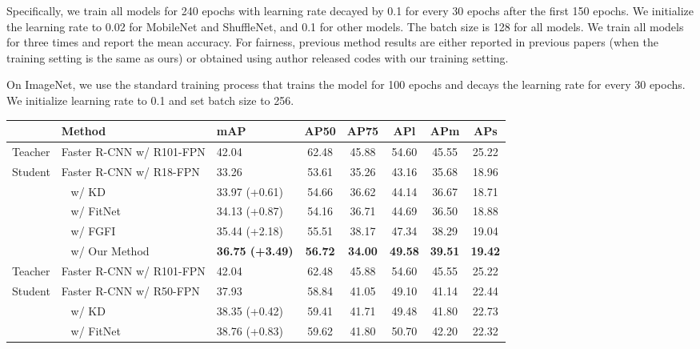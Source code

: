 \documentclass[final]{cvpr}
\begin{document}
Specifically, we train all models for 240 epochs with learning rate decayed by 0.1 for every 30 epochs after the first 150 epochs. We initialize the learning rate to 0.02 for MobileNet and ShuffleNet, and 0.1 for other models. The batch size is 128 for all models. We train all models for three times and report the mean accuracy. For fairness, previous method results are either reported in previous papers (when the training setting is the same as ours) or obtained using author released codes with our training setting.

On ImageNet, we use the standard training process that trains the model for 100 epochs and decays the learning rate for every 30 epochs. We initialize learning rate to 0.1 and set batch size to 256. 



\begin{table*}
	\centering
	\begin{tabular}{l l | l @{\hspace{0.3in}} c@{\hspace{0.3in}} c@{\hspace{0.3in}} c@{\hspace{0.3in}} c@{\hspace{0.3in}} c }
		\toprule
		& Method & mAP & AP50 & AP75 & APl & APm & APs \\
		\midrule
		Teacher                &Faster R-CNN w/ R101-FPN &42.04 &62.48 &45.88 &54.60 &45.55 &25.22 \\
		Student &Faster R-CNN w/ R18-FPN  &33.26 &53.61 &35.26 &43.16 &35.68 &18.96 \\
		& ~ w/ KD \cite{kd}           &33.97 (+0.61) &54.66 &36.62 &44.14 &36.67 &18.71 \\
		& ~ w/ FitNet \cite{fitnet}   &34.13 (+0.87)&54.16 &36.71 &44.69 &36.50 &18.88 \\
		& ~ w/ FGFI \cite{finegrained} &35.44 (+2.18)&55.51 &38.17 &47.34 &38.29 &19.04\\
		& ~ w/ Our Method     &\textbf{36.75 (+3.49)} &\textbf{56.72} &\textbf{34.00} &\textbf{49.58} &\textbf{39.51} &\textbf{19.42} \\
		\midrule
		Teacher                &Faster R-CNN w/ R101-FPN &42.04 &62.48 &45.88 &54.60 &45.55 &25.22 \\
		Student &Faster R-CNN w/ R50-FPN  &37.93 &58.84 &41.05 &49.10 &41.14 &22.44 \\
		& ~ w/ KD \cite{kd}           &38.35 (+0.42) &59.41 &41.71 &49.48 &41.80 &22.73 \\
		& ~ w/ FitNet \cite{fitnet}   &38.76 (+0.83) &59.62 &41.80 &50.70 &42.20 &22.32\\

\end{tabular}
\end{table*}
\end{document}
